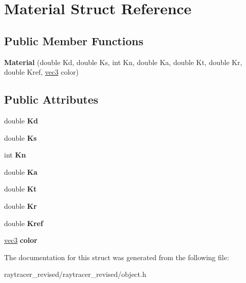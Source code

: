 \hypertarget{struct_material}{
\section{Material Struct Reference}
\label{struct_material}
}
\subsection*{Public Member Functions}
\begin{DoxyCompactItemize}
\item 
\hypertarget{struct_material_ad81b649096ee18a00302a7df874eaaf3}{
{\bfseries Material} (double Kd, double Ks, int Kn, double Ka, double Kt, double Kr, double Kref, \hyperlink{classvec3}{vec3} color)}
\label{struct_material_ad81b649096ee18a00302a7df874eaaf3}

\end{DoxyCompactItemize}
\subsection*{Public Attributes}
\begin{DoxyCompactItemize}
\item 
\hypertarget{struct_material_ae81f1ff3b111ea968b34c908c548305f}{
double {\bfseries Kd}}
\label{struct_material_ae81f1ff3b111ea968b34c908c548305f}

\item 
\hypertarget{struct_material_a72b78fb82dc4d44588d07354d1dc953a}{
double {\bfseries Ks}}
\label{struct_material_a72b78fb82dc4d44588d07354d1dc953a}

\item 
\hypertarget{struct_material_a6884140268fdc5a97e33f19c931be786}{
int {\bfseries Kn}}
\label{struct_material_a6884140268fdc5a97e33f19c931be786}

\item 
\hypertarget{struct_material_ac9a0b7de5f79702018d523934408346b}{
double {\bfseries Ka}}
\label{struct_material_ac9a0b7de5f79702018d523934408346b}

\item 
\hypertarget{struct_material_abc7df73b8dd2be8ba3fedd7d3713c37d}{
double {\bfseries Kt}}
\label{struct_material_abc7df73b8dd2be8ba3fedd7d3713c37d}

\item 
\hypertarget{struct_material_aa166f7e06e7ab097cc521e80390c39f1}{
double {\bfseries Kr}}
\label{struct_material_aa166f7e06e7ab097cc521e80390c39f1}

\item 
\hypertarget{struct_material_a95514c7a761b8146cfc4ddef0eddefac}{
double {\bfseries Kref}}
\label{struct_material_a95514c7a761b8146cfc4ddef0eddefac}

\item 
\hypertarget{struct_material_af06a93d5b51bfddb600726fe39280149}{
\hyperlink{classvec3}{vec3} {\bfseries color}}
\label{struct_material_af06a93d5b51bfddb600726fe39280149}

\end{DoxyCompactItemize}


The documentation for this struct was generated from the following file:\begin{DoxyCompactItemize}
\item 
raytracer\_\-revised/raytracer\_\-revised/object.h\end{DoxyCompactItemize}
